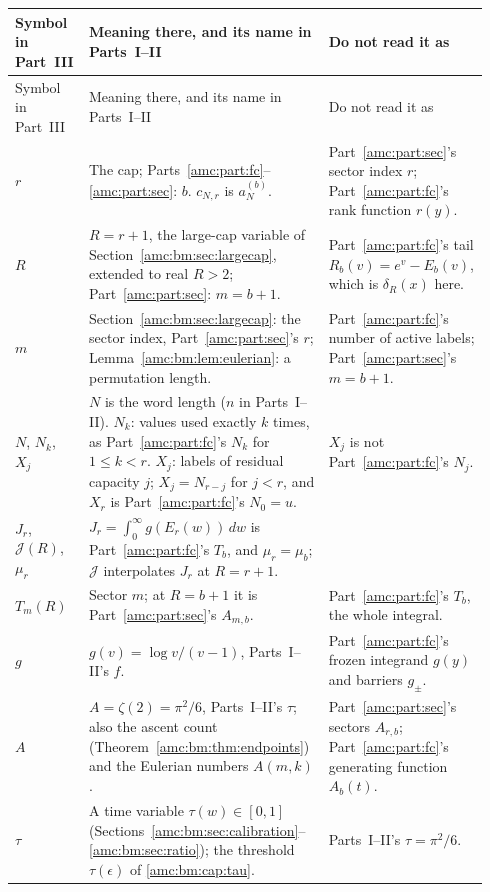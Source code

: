 \documentclass[11pt,letterpaper]{article}
\theoremstyle{remark}\newtheorem{remark}[theorem]{Remark}
\begin{document}
{\small
\begin{longtable}{@{}>{\raggedright\arraybackslash}p{0.13\linewidth}>{\raggedright\arraybackslash}p{0.48\linewidth}>{\raggedright\arraybackslash}p{0.33\linewidth}@{}}
\toprule
Symbol in Part~III & Meaning there, and its name in Parts~I--II & Do not read it as\\
\midrule
\endfirsthead
\toprule
Symbol in Part~III & Meaning there, and its name in Parts~I--II & Do not read it as\\
\midrule
\endhead
\bottomrule
\endfoot
$r$ & The cap; Parts~\ref{amc:part:fc}--\ref{amc:part:sec}: $b$. $c_{N,r}$ is $a_N^{(b)}$. & Part~\ref{amc:part:sec}'s sector index $r$; Part~\ref{amc:part:fc}'s rank function $r(y)$.\\
$R$ & $R=r+1$, the large-cap variable of Section~\ref{amc:bm:sec:largecap}, extended to real $R>2$; Part~\ref{amc:part:sec}: $m=b+1$. & Part~\ref{amc:part:fc}'s tail $R_b(v)=e^v-E_b(v)$, which is $\delta_R(x)$ here.\\
$m$ & Section~\ref{amc:bm:sec:largecap}: the sector index, Part~\ref{amc:part:sec}'s $r$; Lemma~\ref{amc:bm:lem:eulerian}: a permutation length. & Part~\ref{amc:part:fc}'s number of active labels; Part~\ref{amc:part:sec}'s $m=b+1$.\\
$N$, $N_k$, $X_j$ & $N$ is the word length ($n$ in Parts~I--II). $N_k$: values used exactly $k$ times, as Part~\ref{amc:part:fc}'s $N_k$ for $1\le k<r$. $X_j$: labels of residual capacity $j$; $X_j=N_{r-j}$ for $j<r$, and $X_r$ is Part~\ref{amc:part:fc}'s $N_0=u$. & $X_j$ is not Part~\ref{amc:part:fc}'s $N_j$.\\
$J_r$, $\mathcal J(R)$, $\mu_r$ & $J_r=\int_0^\infty g(E_r(w))\,dw$ is Part~\ref{amc:part:fc}'s $T_b$, and $\mu_r=\mu_b$; $\mathcal J$ interpolates $J_r$ at $R=r+1$. & \\
$T_m(R)$ & Sector $m$; at $R=b+1$ it is Part~\ref{amc:part:sec}'s $A_{m,b}$. & Part~\ref{amc:part:fc}'s $T_b$, the whole integral.\\
$g$ & $g(v)=\log v/(v-1)$, Parts~I--II's $f$. & Part~\ref{amc:part:fc}'s frozen integrand $g(y)$ and barriers $g_\pm$.\\
$A$ & $A=\zeta(2)=\pi^2/6$, Parts~I--II's $\tau$; also the ascent count (Theorem~\ref{amc:bm:thm:endpoints}) and the Eulerian numbers $A(m,k)$. & Part~\ref{amc:part:sec}'s sectors $A_{r,b}$; Part~\ref{amc:part:fc}'s generating function $A_b(t)$.\\
$\tau$ & A time variable $\tau(w)\in[0,1]$ (Sections~\ref{amc:bm:sec:calibration}--\ref{amc:bm:sec:ratio}); the threshold $\tau(\epsilon)$ of \eqref{amc:bm:cap:tau}. & Parts~I--II's $\tau=\pi^2/6$.\\

\end{longtable}}
\end{document}
